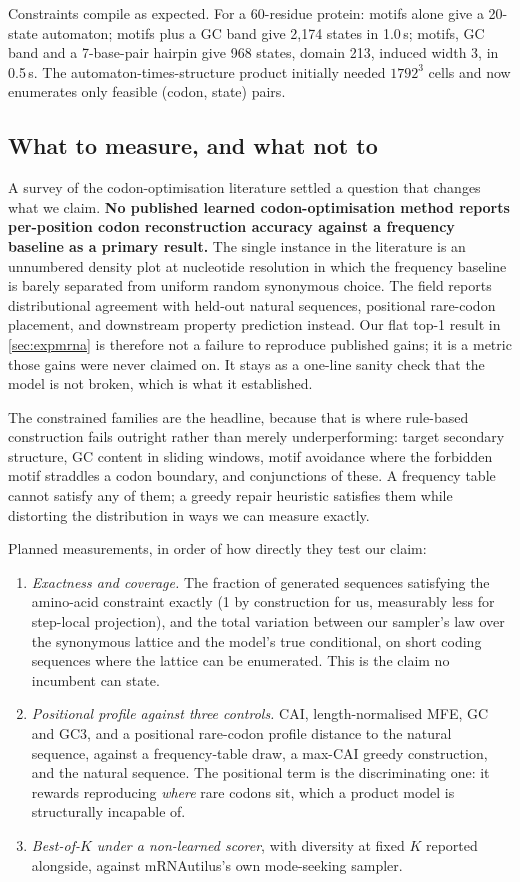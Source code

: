 \documentclass[11pt]{article}
\theoremstyle{definition}
\begin{document}
Constraints compile as expected. For a 60-residue protein: motifs alone give a 20-state automaton; motifs plus a
GC band give 2,174 states in 1.0\,s; motifs, GC band and a 7-base-pair hairpin give 968 states, domain 213,
induced width 3, in 0.5\,s. The automaton-times-structure product initially needed $1792^3$ cells and now
enumerates only feasible (codon, state) pairs.

\subsection{What to measure, and what not to}
A survey of the codon-optimisation literature settled a question that changes what we claim. \textbf{No published learned codon-optimisation method reports per-position codon reconstruction accuracy
against a frequency baseline as a primary result.} The single instance in the literature is an unnumbered density
plot at nucleotide resolution in which the frequency baseline is barely separated from uniform random synonymous
choice. The field reports distributional agreement with held-out natural sequences, positional rare-codon
placement, and downstream property prediction instead. Our flat top-1 result in \cref{sec:expmrna} is therefore
not a failure to reproduce published gains; it is a metric those gains were never claimed on. It stays as a
one-line sanity check that the model is not broken, which is what it established.

The constrained families are the headline, because that is where rule-based construction fails outright rather
than merely underperforming: target secondary structure, GC content in sliding windows, motif avoidance where the
forbidden motif straddles a codon boundary, and conjunctions of these. A frequency table cannot satisfy any of
them; a greedy repair heuristic satisfies them while distorting the distribution in ways we can measure exactly.

Planned measurements, in order of how directly they test our claim:
\begin{enumerate}[nosep,leftmargin=*]
  \item \emph{Exactness and coverage.} The fraction of generated sequences satisfying the amino-acid constraint
    exactly (1 by construction for us, measurably less for step-local projection), and the total variation
    between our sampler's law over the synonymous lattice and the model's true conditional, on short coding
    sequences where the lattice can be enumerated. This is the claim no incumbent can state.
  \item \emph{Positional profile against three controls.} CAI, length-normalised MFE, GC and GC3, and a
    positional rare-codon profile distance to the natural sequence, against a frequency-table draw, a max-CAI
    greedy construction, and the natural sequence. The positional term is the discriminating one: it rewards
    reproducing \emph{where} rare codons sit, which a product model is structurally incapable of.
  \item \emph{Best-of-$K$ under a non-learned scorer}, with diversity at fixed $K$ reported alongside, against
    mRNAutilus's own mode-seeking sampler.
\end{enumerate}
\end{document}
